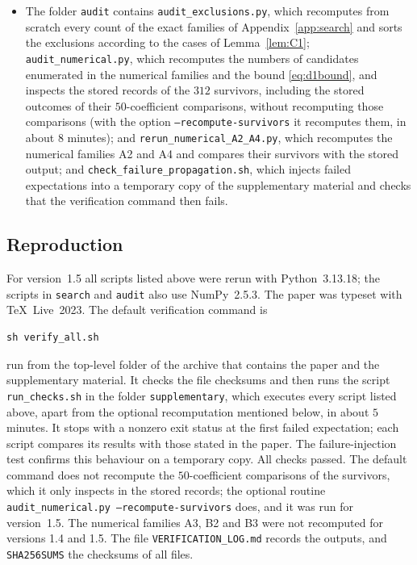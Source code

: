 \documentclass[11pt]{amsart}
\theoremstyle{definition}
\theoremstyle{remark}
\numberwithin{equation}{section}
\begin{document}
\begin{itemize}[leftmargin=2em]
\item The folder \texttt{audit} contains \texttt{audit\_exclusions.py}, which recomputes from scratch every count of the exact families of Appendix~\ref{app:search} and sorts the exclusions according to the cases of Lemma~\ref{lem:C1}; \texttt{audit\_numerical.py}, which recomputes the numbers of candidates enumerated in the numerical families and the bound \eqref{eq:d1bound}, and inspects the stored records of the $312$ survivors, including the stored outcomes of their $50$-coefficient comparisons, without recomputing those comparisons (with the option \texttt{--recompute-survivors} it recomputes them, in about $8$ minutes); and \texttt{rerun\_numerical\_A2\_A4.py}, which recomputes the numerical families A2 and A4 and compares their survivors with the stored output; and \texttt{check\_failure\_propagation.sh}, which injects failed expectations into a temporary copy of the supplementary material and checks that the verification command then fails.
\end{itemize}

\subsection*{Reproduction}
For version~1.5 all scripts listed above were rerun with Python~3.13.18; the scripts in \texttt{search} and \texttt{audit} also use NumPy~2.5.3. The paper was typeset with \TeX\ Live~2023. The default verification command is
\begin{verbatim}
sh verify_all.sh
\end{verbatim}
run from the top-level folder of the archive that contains the paper and the supplementary material. It checks the file checksums and then runs the script \texttt{run\_checks.sh} in the folder \texttt{supplementary}, which executes every script listed above, apart from the optional recomputation mentioned below, in about $5$ minutes. It stops with a nonzero exit status at the first failed expectation; each script compares its results with those stated in the paper. The failure-injection test confirms this behaviour on a temporary copy. All checks passed. The default command does not recompute the $50$-coefficient comparisons of the survivors, which it only inspects in the stored records; the optional routine \texttt{audit\_numerical.py --recompute-survivors} does, and it was run for version~1.5. The numerical families A3, B2 and B3 were not recomputed for versions 1.4 and 1.5. The file \texttt{VERIFICATION\_LOG.md} records the outputs, and \texttt{SHA256SUMS} the checksums of all files.
\end{document}
